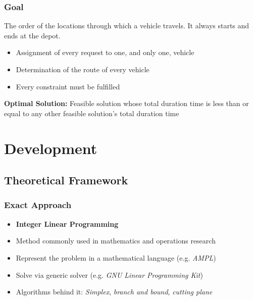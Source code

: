 \documentclass{beamer}
\begin{document}
\begin{frame}
\frametitle{Goal}
\begin{definition}[Route]
The order of the locations through which a vehicle travels. It always starts and ends at the depot.
\end{definition}
\pause
\begin{definition}
\begin{itemize}
\item Assignment of every request to one, and only one, vehicle
\item Determination of the route of every vehicle
\item Every constraint must be fulfilled
\end{itemize}
\end{definition}
\pause
\textbf{Optimal Solution:} Feasible solution whose total duration time is less than or equal to any other feasible solution's total duration time

\end{frame}

\section{Development}
\subsection{Theoretical Framework}

\begin{frame}
\frametitle{Exact Approach}
\begin{itemize}
\item \textbf{Integer Linear Programming}
\item Method commonly used in mathematics and operations research
\item Represent the problem in a mathematical language (e.g. \emph{AMPL})
\item Solve via generic solver (e.g. \emph{GNU Linear Programming Kit})
\item Algorithms behind it: \emph{Simplex}, \emph{branch and bound}, \emph{cutting plane}
\end{itemize}
\end{frame}
\end{document}
